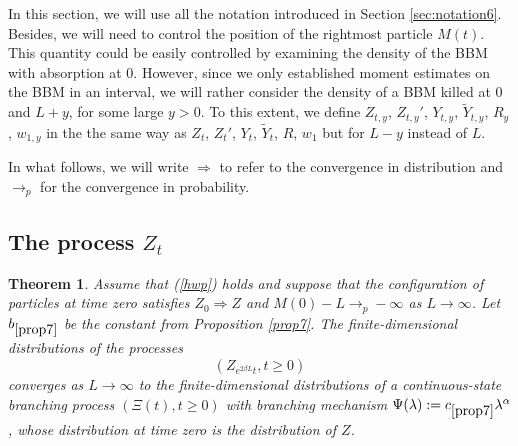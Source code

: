 \documentclass[11pt]{article}
\theoremstyle{plain}
\newtheorem{theorem}[lemma]{Theorem}
\begin{document}

In this section, we will use all the notation introduced in Section \ref{sec:notation6}. Besides,  we will need to control the position of the rightmost particle $M(t)$. This quantity could be easily controlled by examining the density of the BBM with absorption at $0$. However, since we only established moment estimates on the BBM in an interval, we will rather consider the density of a BBM killed at 0 and $L+y$, for some large $y>0$. To this extent, we define $Z_{t,y}$, $Z_{t,y}'$, $Y_{t,y}$, $\tilde{Y}_{t,y}$, $R_y$, $w_{1,y}$ in the the same way as $Z_t$, $Z_{t}'$, $Y_t$, $\tilde{Y}_t$, $R$, $w_1$ but for $L-y$ instead of $L$. 

In what follows, we will write $\Rightarrow$ to refer to the convergence in distribution and $\to_p$ for the convergence in probability. 

\subsection{The process $Z_t$}\label{ztcsbp}



\begin{theorem}\label{th:csbp}
Assume that (\ref{hwp}) holds and suppose that the configuration of particles at time zero satisfies $Z_0\Rightarrow Z$  and   $M(0)-L\rightarrow_p-\infty$ as $L\rightarrow \infty$. Let $b_{\ref{prop7}}$ be the constant from Proposition \ref{prop7}. The finite-dimensional distributions of the processes
\begin{equation*}
\left(Z_{e^{2\beta L} t}, t\geqslant 0\right)
\end{equation*} converges as $L\rightarrow \infty$  to the finite-dimensional distributions of a continuous-state branching process $(\Xi(t),t\geqslant 0)$ with branching mechanism $\Psi(\lambda):=c_{\ref{prop7}}\lambda^\alpha$, whose distribution at time zero is the distribution of $Z$.
\end{theorem}
\end{document}
